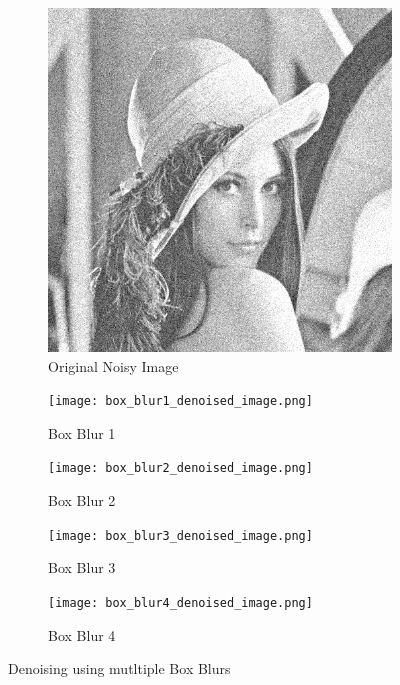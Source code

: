 \documentclass[12pt]{report}
\begin{document}
\begin{figure}[H]
    \centering
    \begin{subfigure}{0.3\textwidth}
        \centering
        \includegraphics[width=\linewidth]{Noisy_Lena.png}
        \caption{Original Noisy Image}
    \end{subfigure}
    \begin{subfigure}{0.3\textwidth}
        \centering
        \texttt{[image: box\_blur1\_denoised\_image.png]}
        \caption{Box Blur 1}
    \end{subfigure}
    \begin{subfigure}{0.3\textwidth}
        \centering
        \texttt{[image: box\_blur2\_denoised\_image.png]}
        \caption{Box Blur 2}
    \end{subfigure}
    \begin{subfigure}{0.3\textwidth}
        \centering
        \texttt{[image: box\_blur3\_denoised\_image.png]}
        \caption{Box Blur 3}
    \end{subfigure}
    \begin{subfigure}{0.3\textwidth}
        \centering
        \texttt{[image: box\_blur4\_denoised\_image.png]}
        \caption{Box Blur 4}
    \end{subfigure}
    \caption{Denoising using mutltiple Box Blurs}
\end{figure}
\end{document}
